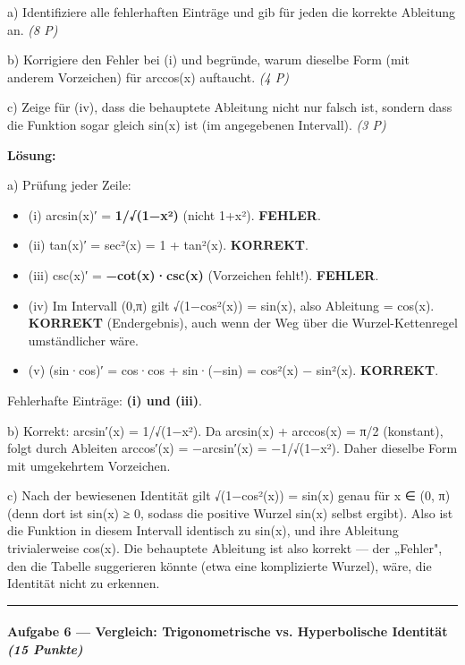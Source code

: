 \documentclass[11pt, a4paper]{article}
\begin{document}
a) Identifiziere alle fehlerhaften Einträge und gib für jeden die korrekte Ableitung an. \textit{(8 P)}


b) Korrigiere den Fehler bei (i) und begründe, warum dieselbe Form (mit anderem Vorzeichen) für arccos(x) auftaucht. \textit{(4 P)}


c) Zeige für (iv), dass die behauptete Ableitung nicht nur falsch ist, sondern dass die Funktion sogar gleich sin(x) ist (im angegebenen Intervall). \textit{(3 P)}


\textbf{Lösung:}


a) Prüfung jeder Zeile:

\begin{itemize}
  \item (i) arcsin(x)′ = \textbf{1/√(1−x²)} (nicht 1+x²). \textbf{FEHLER}.
  \item (ii) tan(x)′ = sec²(x) = 1 + tan²(x). \textbf{KORREKT}.
  \item (iii) csc(x)′ = \textbf{−cot(x)·csc(x)} (Vorzeichen fehlt!). \textbf{FEHLER}.
  \item (iv) Im Intervall (0,π) gilt √(1−cos²(x)) = sin(x), also Ableitung = cos(x). \textbf{KORREKT} (Endergebnis), auch wenn der Weg über die Wurzel-Kettenregel umständlicher wäre.
  \item (v) (sin·cos)′ = cos·cos + sin·(−sin) = cos²(x) − sin²(x). \textbf{KORREKT}.
\end{itemize}

Fehlerhafte Einträge: \textbf{(i) und (iii)}.


b) Korrekt: arcsin′(x) = 1/√(1−x²). Da arcsin(x) + arccos(x) = π/2 (konstant), folgt durch Ableiten arccos′(x) = −arcsin′(x) = −1/√(1−x²). Daher dieselbe Form mit umgekehrtem Vorzeichen.


c) Nach der bewiesenen Identität gilt √(1−cos²(x)) = sin(x) genau für x ∈ (0, π) (denn dort ist sin(x) ≥ 0, sodass die positive Wurzel sin(x) selbst ergibt). Also ist die Funktion in diesem Intervall identisch zu sin(x), und ihre Ableitung trivialerweise cos(x). Die behauptete Ableitung ist also korrekt — der „Fehler", den die Tabelle suggerieren könnte (etwa eine komplizierte Wurzel), wäre, die Identität nicht zu erkennen.



\noindent\textcolor{rulegray}{\rule{\linewidth}{0.4pt}}


\paragraph{Aufgabe 6 — Vergleich: Trigonometrische vs. Hyperbolische Identität \textit{(15 Punkte)}}\mbox{}\\[2pt]
\end{document}

